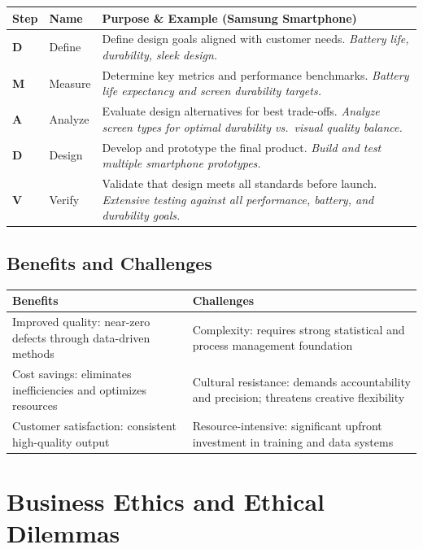 \documentclass[11pt, letterpaper]{article}
\begin{document}
\begin{center}
\begin{tabular}{>{\bfseries}p{2cm} p{4cm} p{6.5cm}}
\toprule
Step & Name & Purpose \& Example (Samsung Smartphone) \\
\midrule
D & Define & Define design goals aligned with customer needs. \textit{Battery life, durability, sleek design.} \\
M & Measure & Determine key metrics and performance benchmarks. \textit{Battery life expectancy and screen durability targets.} \\
A & Analyze & Evaluate design alternatives for best trade-offs. \textit{Analyze screen types for optimal durability vs.\ visual quality balance.} \\
D & Design & Develop and prototype the final product. \textit{Build and test multiple smartphone prototypes.} \\
V & Verify & Validate that design meets all standards before launch. \textit{Extensive testing against all performance, battery, and durability goals.} \\
\bottomrule
\end{tabular}
\end{center}

\subsection{Benefits and Challenges}

\begin{center}
\begin{tabular}{p{6.5cm} p{6.5cm}}
\toprule
\textbf{Benefits} & \textbf{Challenges} \\
\midrule
Improved quality: near-zero defects through data-driven methods & Complexity: requires strong statistical and process management foundation \\
Cost savings: eliminates inefficiencies and optimizes resources & Cultural resistance: demands accountability and precision; threatens creative flexibility \\
Customer satisfaction: consistent high-quality output & Resource-intensive: significant upfront investment in training and data systems \\
\bottomrule
\end{tabular}
\end{center}

\newpage

\section{Business Ethics and Ethical Dilemmas}
\end{document}
